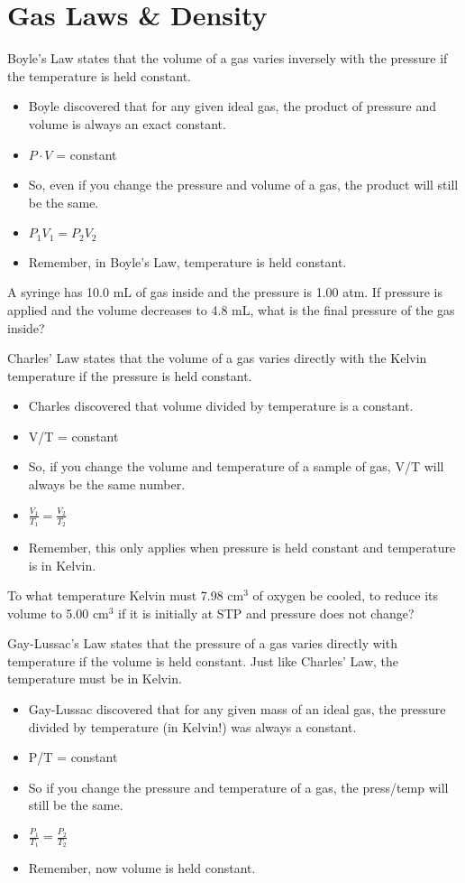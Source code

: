 \documentclass[../hchem.tex]{subfiles}
\begin{document}
\section{Gas Laws \& Density}
Boyle's Law states that the volume of a gas varies inversely with the pressure if the temperature is held constant.
\begin{itemize}
    \item Boyle discovered that for any given ideal gas, the product of pressure and volume is always an exact constant.
    \item $P\cdot V$ = constant 
    \item So, even if you change the pressure and volume of a gas, the product will still be the same.
    \item $P_1V_1=P_2V_2$
    \item Remember, in Boyle's Law, temperature is held constant.
\end{itemize}

\ex A syringe has 10.0 mL of gas inside and the pressure is 1.00 atm. If pressure is applied and the volume decreases to 4.8 mL, what is the final pressure of the gas inside?

Charles' Law states that the volume of a gas varies directly with the Kelvin temperature if the pressure is held constant.
\begin{itemize}
    \item Charles discovered that volume divided by temperature is a constant.
    \item V/T = constant 
    \item So, if you change the volume and temperature of a sample of gas, V/T will always be the same number.
    \item $\frac{V_1}{T_1}=\frac{V_2}{T_2}$
    \item Remember, this only applies when pressure is held constant and temperature is in Kelvin.
\end{itemize}

\ex To what temperature Kelvin must 7.98 cm$^3$ of oxygen be cooled, to reduce its volume to 5.00 cm$^3$ if it is initially at STP and pressure does not change?

Gay-Lussac's Law states that the pressure of a gas varies directly with temperature if the volume is held constant. Just like Charles' Law, the temperature must be in Kelvin.
\begin{itemize}
    \item Gay-Lussac discovered that for any given mass of an ideal gas, the pressure divided by temperature (in Kelvin!) was always a constant.
    \item P/T = constant 
    \item So if you change the pressure and temperature of a gas, the press/temp will still be the same.
    \item $\frac{P_1}{T_1}=\frac{P_2}{T_2}$
    \item Remember, now volume is held constant.
\end{itemize}
\end{document}
